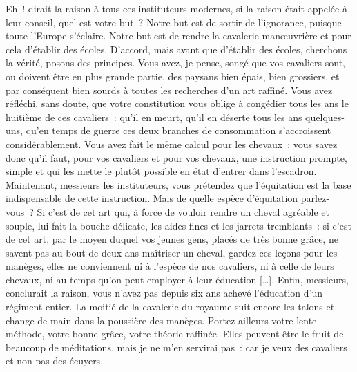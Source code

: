 \documentclass[french,twoside]{book} %
\begin{document}
Eh ! dirait la raison à tous ces instituteurs modernes, si la raison était appelée à leur conseil, quel est votre but ? Notre but est de sortir de l’ignorance, puisque toute l’Europe s’éclaire. Notre but est de rendre la cavalerie manœuvrière et pour cela d’établir des écoles. D’accord, mais avant que d’établir des écoles, cherchons la vérité, posons des principes. Vous avez, je pense, songé que vos cavaliers sont, ou doivent être en plus grande partie, des paysans bien épais, bien grossiers, et par conséquent bien sourds à toutes les recherches d’un art raffiné. Vous avez réfléchi, sans doute, que votre constitution vous oblige à congédier tous les ans le huitième de ces cavaliers : qu’il en meurt, qu’il en déserte tous les ans quelques-uns, qu’en temps de guerre ces deux branches de consommation s’accroissent considérablement. Vous avez fait le même calcul pour les chevaux : vous savez donc qu’il faut, pour vos cavaliers et pour vos chevaux, une instruction prompte, simple et qui les mette le plutôt possible en état d’entrer dans l’escadron. Maintenant, messieurs les instituteurs, vous prétendez que l’équitation est la base indispensable de cette instruction. Mais de quelle espèce d’équitation parlez-vous ? Si c’est de cet art qui, à force de vouloir rendre un cheval agréable et souple, lui fait la bouche délicate, les aides fines et les jarrets tremblants : si c’est de cet art, par le moyen duquel vos jeunes gens, placés de très bonne grâce, ne savent pas au bout de deux ans maîtriser un cheval, gardez ces leçons pour les manèges, elles ne conviennent ni à l’espèce de nos cavaliers, ni à celle de leurs chevaux, ni au temps qu’on peut employer à leur éducation […]. Enfin, messieurs, conclurait la raison, vous n’avez pas depuis six ans achevé l’éducation d’un régiment entier. La moitié de la cavalerie du royaume suit encore les talons et change de main dans la poussière des manèges. Portez ailleurs votre lente méthode, votre bonne grâce, votre théorie raffinée. Elles peuvent être le fruit de beaucoup de méditations, mais je ne m’en servirai pas : car je veux des cavaliers et non pas des écuyers.\par
\end{document}
